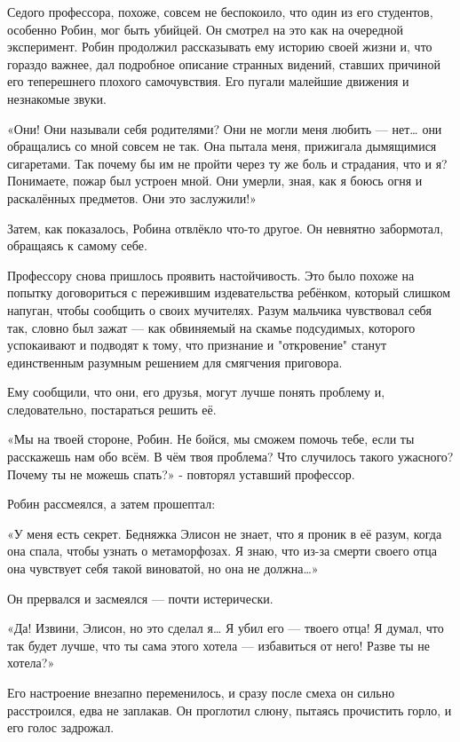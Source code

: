 \documentclass[a5paper, 9pt,
final, openany, twoside=true]{memoir}
\begin{document}
Седого профессора, похоже, совсем не беспокоило, что один из его студентов, особенно Робин, мог быть убийцей. Он смотрел на это как на очередной эксперимент. Робин продолжил рассказывать ему историю своей жизни и, что гораздо важнее, дал подробное описание странных видений, ставших причиной его теперешнего плохого самочувствия. Его пугали малейшие движения и незнакомые звуки.

«Они! Они называли себя родителями? Они не могли меня любить — нет… они обращались со мной совсем не так. Она пытала меня, прижигала дымящимися сигаретами. Так почему бы им не пройти через ту же боль и страдания, что и я? Понимаете, пожар был устроен мной. Они умерли, зная, как я боюсь огня и раскалённых предметов. Они это заслужили!»

Затем, как показалось, Робина отвлёкло что-то другое. Он невнятно забормотал, обращаясь к самому себе.

Профессору снова пришлось проявить настойчивость. Это было похоже на попытку договориться с пережившим издевательства ребёнком, который слишком напуган, чтобы сообщить о своих мучителях. Разум мальчика чувствовал себя так, словно был зажат — как обвиняемый на скамье подсудимых, которого успокаивают и подводят к тому, что признание и "откровение" станут единственным разумным решением для смягчения приговора.

Ему сообщили, что они, его друзья, могут лучше понять проблему и, следовательно, постараться решить её.

«Мы на твоей стороне, Робин. Не бойся, мы сможем помочь тебе, если ты расскажешь нам обо всём. В чём твоя проблема? Что случилось такого ужасного? Почему ты не можешь спать?» - повторял уставший профессор.

Робин рассмеялся, а затем прошептал:

«У меня есть секрет. Бедняжка Элисон не знает, что я проник в её разум, когда она спала, чтобы узнать о метаморфозах. Я знаю, что из-за смерти своего отца она чувствует себя такой виноватой, но она не должна…»

Он прервался и засмеялся — почти истерически.

«Да! Извини, Элисон, но это сделал я… Я убил его — твоего отца! Я думал, что так будет лучше, что ты сама этого хотела — избавиться от него! Разве ты не хотела?»

Его настроение внезапно переменилось, и сразу после смеха он сильно расстроился, едва не заплакав. Он проглотил слюну, пытаясь прочистить горло, и его голос задрожал.
\end{document}
